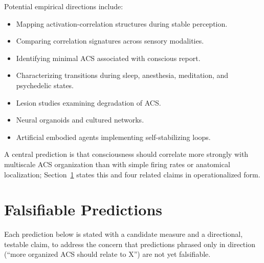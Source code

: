 \documentclass[11pt]{article}
\begin{document}
Potential empirical directions include:
\begin{itemize}[nosep]
  \item Mapping activation-correlation structures during stable perception.
  \item Comparing correlation signatures across sensory modalities.
  \item Identifying minimal ACS associated with conscious report.
  \item Characterizing transitions during sleep, anesthesia, meditation, and psychedelic states.
  \item Lesion studies examining degradation of ACS.
  \item Neural organoids and cultured networks.
  \item Artificial embodied agents implementing self-stabilizing loops.
\end{itemize}

A central prediction is that consciousness should correlate more strongly with multiscale ACS organization than with simple firing rates or anatomical localization; Section~\ref{sec:predictions} states this and four related claims in operationalized form.

\section{Falsifiable Predictions}
\label{sec:predictions}

Each prediction below is stated with a candidate measure and a directional, testable claim, to address the concern that predictions phrased only in direction (``more organized ACS should relate to X'') are not yet falsifiable.
\end{document}
